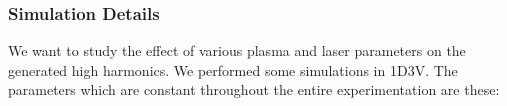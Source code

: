 \documentclass{beamer}
\begin{document}
\begin{frame}
    \frametitle{Simulation Details}
    \small
    We want to study the effect of various plasma and laser parameters on the generated high harmonics. We performed some simulations in 1D3V. The parameters which are constant throughout the entire experimentation are these:


\end{frame}
\end{document}
